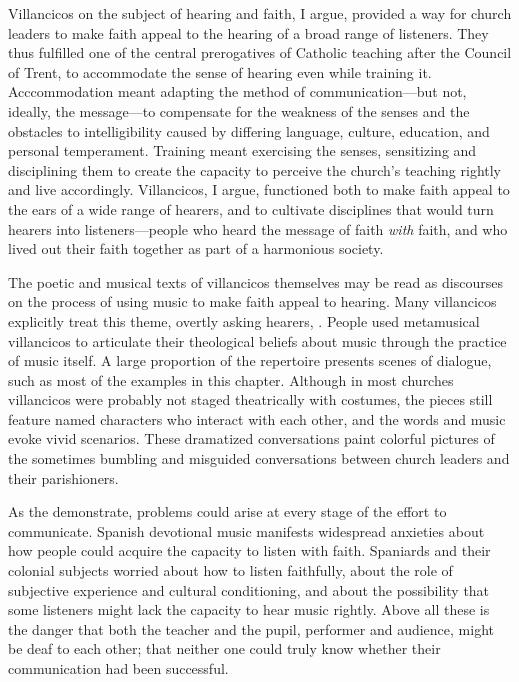 Villancicos on the subject of hearing and faith, I argue, provided a way for
church leaders to make faith appeal to the hearing of a broad range of
listeners.
They thus fulfilled one of the central prerogatives of Catholic teaching after
the Council of Trent, to accommodate the sense of hearing even while training
it.
Acccommodation meant adapting the method of communication---but not, ideally,
the message---to compensate for the weakness of the senses and the obstacles to
intelligibility caused by differing language, culture, education, and personal
temperament. 
Training meant exercising the senses, sensitizing and disciplining them to
create the capacity to perceive the church's teaching rightly and live
accordingly.
Villancicos, I argue, functioned both to make faith appeal to the
ears of a wide range of hearers, and to cultivate disciplines that would turn
hearers into listeners---people who heard the message of faith \emph{with}
faith, and who lived out their faith together as part of a harmonious society.


The poetic and musical texts of villancicos themselves may be read as discourses
on the process of using music to make faith appeal to hearing.
Many villancicos explicitly treat this theme, overtly asking hearers,
 .
People used metamusical villancicos to articulate their theological beliefs
about music through the practice of music itself.
A large proportion of the repertoire presents scenes of dialogue, such as most
of the examples in this chapter.
Although in most churches villancicos were probably not staged theatrically with
costumes, the pieces still feature named characters who interact with each
other, and the words and music evoke vivid scenarios.
These dramatized conversations paint colorful pictures of the sometimes bumbling
and misguided conversations between church leaders and their parishioners.

As the  demonstrate, problems could arise at
every stage of the effort to communicate.
Spanish devotional music manifests widespread anxieties about how people could
acquire the capacity to listen with faith.
Spaniards and their colonial subjects worried about how to listen faithfully,
about the role of subjective experience and cultural conditioning, and about the
possibility that some listeners might lack the capacity to hear music rightly.
Above all these is the danger that both the teacher and the pupil, performer and
audience, might be deaf to each other; that neither one could truly know whether
their communication had been successful.

